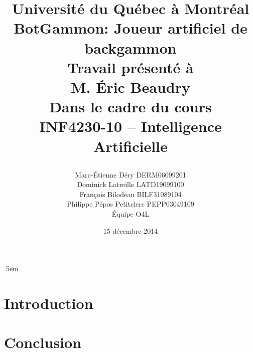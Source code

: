 \documentclass{article}
\title{%
\Large{Université du Québec à Montréal}\\
\vspace{3cm}
\huge{BotGammon: Joueur artificiel de backgammon}\\
\vspace{3cm}
\Large{Travail présenté à \\M. Éric Beaudry} \\
\vspace{1.5cm}
\Large{Dans le cadre du cours \\INF4230-10 – Intelligence Artificielle} \\
\vspace{1cm}
\author{Marc-Étienne Déry DERM06099201\\Dominick Latreille LATD19099100\\François Bilodeau BILF31089104\\Philippe Pépos Petitclerc PEPP03049109\\Équipe O4L}
\date{\vspace{0.5cm} 15 décembre 2014}
\vfill
}
\begin{document}
\maketitle

\thispagestyle{empty}
\clearpage

\openup .5em

\section{Introduction}


\clearpage

\section{}
\subsection{}
\subsection{}
\clearpage

\section{}
\clearpage 

\section{}

\subsection{}
\subsection{}
\clearpage

\section{Conclusion}
\end{document}
